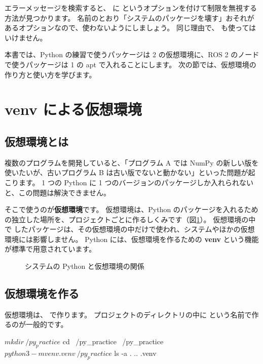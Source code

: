 \begin{caution}
  エラーメッセージを検索すると、 に  というオプションを付けて制限を無視する方法が見つかります。
  名前のとおり「システムのパッケージを壊す」おそれがあるオプションなので、使わないようにしましょう。
  同じ理由で、 も使ってはいけません。
\end{caution}

本書では、Python の練習で使うパッケージは 2 の仮想環境に、ROS 2 のノードで使うパッケージは 1 の apt で入れることにします。
次の節では、仮想環境の作り方と使い方を学びます。

\section{venv による仮想環境}
\label{sec:python-venv}

\subsection{仮想環境とは}

複数のプログラムを開発していると、「プログラム A では NumPy の新しい版を使いたいが、古いプログラム B は古い版でないと動かない」といった問題が起こります。
1 つの Python に 1 つのバージョンのパッケージしか入れられないと、この問題は解決できません。

そこで使うのが\textbf{仮想環境}です。
仮想環境は、Python のパッケージを入れるための独立した場所を、プロジェクトごとに作るしくみです（図\ref{fig:python-env-venv}）。
仮想環境の中で  したパッケージは、その仮想環境の中だけで使われ、システムやほかの仮想環境には影響しません。
Python には、仮想環境を作るための \textbf{venv} という機能が標準で用意されています。

\begin{figure}[tb]
  \centering
  
  \caption{システムの Python と仮想環境の関係}
  \label{fig:python-env-venv}
\end{figure}

\subsection{仮想環境を作る}

仮想環境は、 で作ります。
プロジェクトのディレクトリの中に  という名前で作るのが一般的です。

\begin{terminal}[仮想環境を作る]
$ mkdir ~/py_practice
$ cd ~/py_practice
~/py_practice$ python3 -m venv .venv
~/py_practice$ ls -a
.  ..  .venv
\end{terminal}

